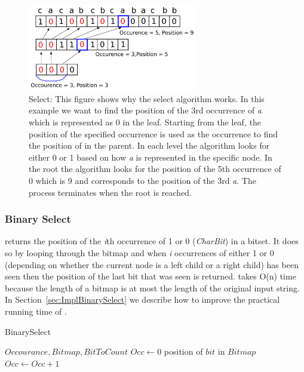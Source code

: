 \begin{figure}
\center \includegraphics[width=0.66\textwidth]{SelectDrawing}
\caption{Select: This figure shows why the select algorithm works. 
In this example we want to find the position of the 3rd occurrence of \textit{a} which is represented as 0 in the leaf.
Starting from the leaf, the position of the specified occurrence is used as the occurrence to find the position of in the parent. 
In each level the algorithm looks for either 0 or 1 based on how \textit{a} is represented in the specific node.
In the root the algorithm looks for the position of the 5th occurrence of 0 which is 9 and corresponds to the position of the 3rd \textit{a}.
The process terminates when the root is reached.}
\label{fig:SelectDrawing}
\end{figure}





\subsubsection{Binary Select}
\label{sec:binarySelectDescription}
 returns the position of the \textit{i}th occurrence of 1 or 0 (\textit{CharBit}) in a bitset. 
It does so by looping through the bitmap and when \textit{i} occurrences of either 1 or 0 (depending on whether the current node is a left child or a right child) has been seen then the position of the last bit that was seen is returned.
 takes O(n) time because the length of a bitmap is at most the length of the original input string.
In Section~\ref{sec:ImplBinarySelect} we describe how to improve the practical running time of .


\begin{algorithm}
\caption{BinarySelect}
\label{alg:binaryselect}
\begin{algorithmic}
 {$Occourance, Bitmap, BitToCount$}
\State $Occ \gets 0$
		\State \Return position of $bit$ in $Bitmap$
	\EndIf
	\State $Occ \gets Occ + 1$
	\EndIf
\EndFor
\EndFunction
\end{algorithmic}
\end{algorithm}
